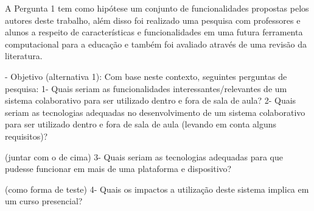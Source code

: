




A Pergunta 1 tem como hipótese um conjunto de funcionalidades propostas pelos autores deste trabalho, além disso foi realizado uma pesquisa com professores e alunos a respeito de características e funcionalidades em uma futura ferramenta computacional para a educação e também foi avaliado através de uma revisão da literatura.

- Objetivo (alternativa 1):
                Com base neste contexto, seguintes perguntas de pesquisa:
                    1- Quais seriam as funcionalidades interessantes/relevantes de um sistema colaborativo para ser utilizado dentro e fora de sala de aula?
                    2- Quais seriam as tecnologias adequadas no desenvolvimento de um sistema colaborativo para ser utilizado dentro e fora de sala de aula (levando em conta alguns requisitos)?

                    (juntar com o de cima) 3- Quais seriam as tecnologias adequadas para que pudesse funcionar em mais de uma plataforma e dispositivo?

                    (como forma de teste) 4- Quais os impactos a utilização deste sistema implica em um curso presencial?

